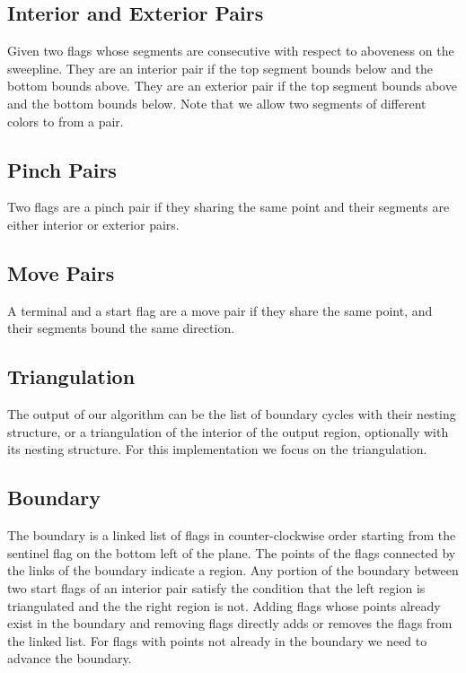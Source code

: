 \documentclass[11pt]{article}
\begin{document}
\subsection{Interior and Exterior Pairs}
Given two flags whose segments are consecutive with respect to aboveness on the sweepline.
They are an interior pair if the top segment bounds below and the bottom bounds above.
They are an exterior pair if the top segment bounds above and the bottom bounds below.
Note that we allow two segments of different colors to from a pair.

\subsection{Pinch Pairs}
Two flags are a pinch pair if they sharing the same point and their segments are either interior or exterior pairs.

\subsection{Move Pairs}
A terminal and a start flag are a move pair if they share the same point, and their segments bound the same direction.

\subsection{Triangulation}
The output of our algorithm can be the list of boundary cycles with their nesting structure, or a triangulation of the interior of the output region, optionally with its nesting structure. For this implementation we focus on the triangulation.

\subsection{Boundary} \label{sec boundary}
The boundary is a linked list of flags in counter-clockwise order starting from the sentinel flag on the bottom left of the plane.
The points of the flags connected by the links of the boundary indicate a region.
Any portion of the boundary between two start flags of an interior pair satisfy the condition that the left region is triangulated and the the right region is not.
Adding flags whose points already exist in the boundary and removing flags directly adds or removes the flags from the linked list.
For flags with points not already in the boundary we need to advance the boundary.
\end{document}
